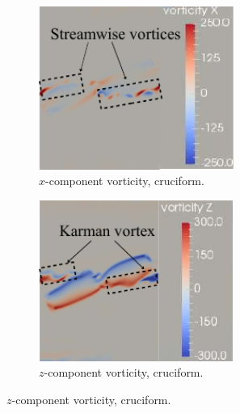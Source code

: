 \documentclass[a4paper,fleqn]{cas-sc}
\begin{document}
\begin{figure}
  \centering
  \begin{subfigure}[h]{0.4\textwidth}
    \centering
    \includegraphics[width=0.7\textwidth]{figs/vorx225}
    \caption{$x$-component vorticity, \angfo{} cruciform.}
    \label{fig:vorx225}
  \end{subfigure}
  \begin{subfigure}[h]{0.4\textwidth}
    \centering
    \includegraphics[width=0.7\textwidth]{figs/vorz225}
    \caption{$z$-component vorticity, \angfo{} cruciform.}
    \label{fig:vorz225}
  \end{subfigure}


\end{figure}
\end{document}

